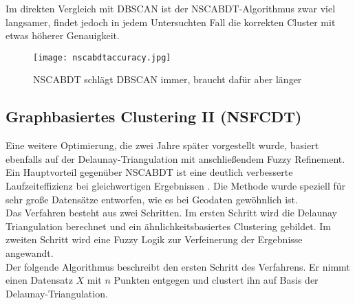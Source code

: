 \documentclass[11pt,ceqn]{book}
\begin{document}
\vspace{\belowdisplayskip}

Im direkten Vergleich mit DBSCAN ist der NSCABDT-Algorithmus zwar viel langsamer, findet jedoch in jedem Untersuchten Fall die korrekten Cluster mit etwas höherer Genauigkeit.
\begin{figure}[H]
\centering
\texttt{[image: nscabdtaccuracy.jpg]}
\caption{NSCABDT schlägt DBSCAN immer, braucht dafür aber länger}
\end{figure}



\clearpage
\vspace*{\fill}
\begin{center}
\begin{minipage}{1\textwidth}
\subsection{Graphbasiertes Clustering II (NSFCDT)}

Eine weitere Optimierung, die zwei Jahre später vorgestellt wurde, basiert ebenfalls auf der Delaunay-Triangulation mit anschließendem Fuzzy Refinement. Ein Hauptvorteil gegenüber NSCABDT ist eine deutlich verbesserte Laufzeiteffizienz bei gleichwertigen Ergebnissen \cite{nsfcdt}. Die Methode wurde speziell für sehr große Datensätze entworfen, wie es bei Geodaten gewöhnlich ist.\\

Das Verfahren besteht aus zwei Schritten. Im ersten Schritt wird die Delaunay Triangulation berechnet und ein ähnlichkeitsbasiertes Clustering gebildet. Im zweiten Schritt wird eine Fuzzy Logik zur Verfeinerung der Ergebnisse angewandt.\\


Der folgende Algorithmus beschreibt den ersten Schritt des Verfahrens. Er nimmt einen Datensatz $X$ mit $n$ Punkten entgegen und clustert ihn auf Basis der Delaunay-Triangulation.


\end{minipage}
\end{center}
\end{document}
